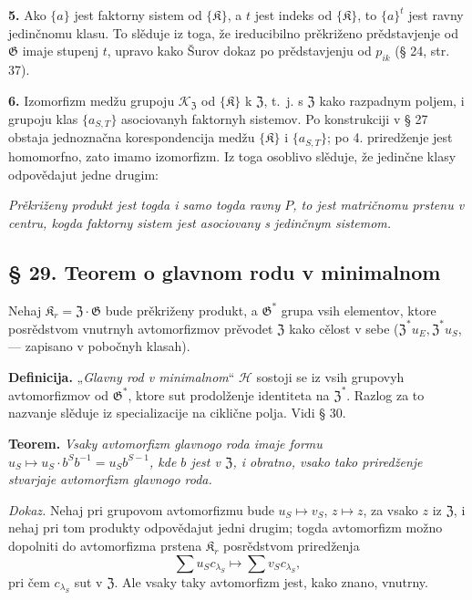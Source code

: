 \documentclass[11pt]{article}
\begin{document}
\noindent\textbf{5.} Ako \(\{a\}\) jest faktorny sistem od \(\{\mathfrak K\}\), a \(t\) jest indeks od \(\{\mathfrak K\}\), to \(\{a\}^t\) jest ravny jedinčnomu klasu. To slěduje iz toga, že ireducibilno prěkriženo prědstavjenje od \(\mathfrak G\) imaje stupenj \(t\), upravo kako Šurov dokaz po prědstavjenju od \(p_{ik}\) (§ 24, str. 37).

\noindent\textbf{6.} Izomorfizm medžu grupoju \(\mathscr K_{\mathfrak Z}\) od \(\{\mathfrak K\}\) k \(\mathfrak Z\), t.~j. s \(\mathfrak Z\) kako razpadnym poljem, i grupoju klas \(\{a_{S,T}\}\) asociovanyh faktornyh sistemov. Po konstrukciji v § 27 obstaja jednoznačna korespondencija medžu \(\{\mathfrak K\}\) i \(\{a_{S,T}\}\); po 4. priredženje jest homomorfno, zato imamo izomorfizm. Iz toga osoblivo slěduje, že jedinčne klasy odpovědajut jedne drugim:

\noindent\emph{Prěkriženy produkt jest togda i samo togda ravny \(P\), to jest matričnomu prstenu v centru, kogda faktorny sistem jest asociovany s jedinčnym sistemom.}

\subsection*{§ 29. Teorem o glavnom rodu v minimalnom}\label{hauptgeschlechtssatz-im-minimalen}

Nehaj \(\mathfrak K_r=\mathfrak Z\cdot\mathfrak G\) bude prěkriženy produkt, a \(\mathfrak G^*\) grupa vsih elementov, ktore posrědstvom vnutrnyh avtomorfizmov prěvodet \(\mathfrak Z\) kako cělost v sebe (\(\mathfrak Z^*u_E,\mathfrak Z^*u_S\), --- zapisano v pobočnyh klasah).

\noindent\textbf{Definicija.} „\emph{Glavny rod v minimalnom}“ \(\mathscr H\) sostoji se iz vsih grupovyh avtomorfizmov od \(\mathfrak G^*\), ktore sut prodolženje identiteta na \(\mathfrak Z^*\). Razlog za to nazvanje slěduje iz specializacije na ciklične polja. Vidi § 30.

\noindent\textbf{Teorem.} \emph{Vsaky avtomorfizm glavnogo roda imaje formu \(u_S\mapsto u_S\cdot b^Sb^{-1}=u_Sb^{S-1}\), kde \(b\) jest v \(\mathfrak Z\), i obratno, vsako tako priredženje stvarjaje avtomorfizm glavnogo roda.}

\noindent\emph{Dokaz.} Nehaj pri grupovom avtomorfizmu bude \(u_S\mapsto v_S\), \(z\mapsto z\), za vsako \(z\) iz \(\mathfrak Z\), i nehaj pri tom produkty odpovědajut jedni drugim; togda avtomorfizm možno dopolniti do avtomorfizma prstena \(\mathfrak K_r\) posrědstvom priredženja
\[
\sum u_Sc_{\lambda_S}\mapsto\sum v_Sc_{\lambda_S},
\]
pri čem \(c_{\lambda_S}\) sut v \(\mathfrak Z\). Ale vsaky taky avtomorfizm jest, kako znano, vnutrny.
\end{document}
